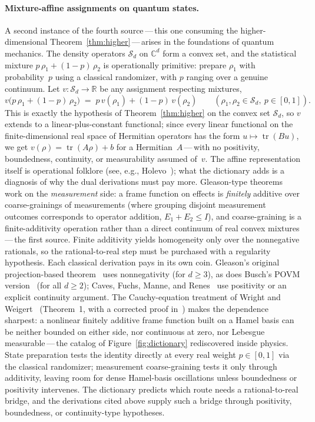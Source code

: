 \documentclass{article}
\theoremstyle{plain}
\theoremstyle{definition}
\newcommand{\R}{\mathbb{R}}
\begin{document}
\paragraph{Mixture-affine assignments on quantum states.}
A second instance of the fourth source\,---\,this one consuming the
higher-dimensional Theorem~\ref{thm:higher}\,---\,arises in the
foundations of quantum mechanics. The density operators
$\mathcal{S}_d$ on $\mathbb{C}^d$ form a convex set, and the
statistical mixture $p\,\rho_1+(1-p)\,\rho_2$ is operationally
primitive: prepare $\rho_1$ with probability~$p$ using a classical
randomizer, with $p$ ranging over a genuine continuum. Let
$v\colon\mathcal{S}_d\to\R$ be any assignment respecting mixtures,
\[
v\bigl(p\,\rho_1+(1-p)\,\rho_2\bigr)\;=\;p\,v(\rho_1)+(1-p)\,v(\rho_2)
\qquad(\rho_1,\rho_2\in\mathcal{S}_d,\ p\in[0,1]).
\]
This is exactly the hypothesis of Theorem~\ref{thm:higher} on the
convex set $\mathcal{S}_d$, so $v$ extends to a linear-plus-constant
functional; since every linear functional on the finite-dimensional
real space of Hermitian operators has the form
$u\mapsto\operatorname{tr}(Bu)$, we get
$v(\rho)=\operatorname{tr}(A\rho)+b$ for a Hermitian~$A$\,---\,with
no positivity, boundedness, continuity, or measurability assumed
of~$v$. The affine representation itself is operational folklore
(see, e.g., Holevo~\cite[Lemma~1.6.1]{Holevo1982}); what the
dictionary adds is a diagnosis of why the dual derivations must pay
more. Gleason-type theorems work on the \emph{measurement} side: a
frame function on effects is \emph{finitely} additive over
coarse-grainings of measurements (where grouping disjoint measurement
outcomes corresponds to operator addition, $E_1 + E_2 \le I$), and
coarse-graining is a finite-additivity operation rather than a direct continuum of real convex mixtures\,---\,the first source.
Finite additivity yields homogeneity only over the nonnegative rationals, so the rational-to-real step must be purchased with a regularity hypothesis. Each classical derivation pays in its own coin. Gleason's original projection-based theorem~\cite{Gleason1957} uses nonnegativity (for $d \ge 3$), as does Busch's POVM version~\cite{Busch2003} (for all $d \ge 2$); Caves, Fuchs, Manne, and Renes~\cite{CFMR2004} use positivity or an explicit continuity argument. The Cauchy-equation treatment of Wright and Weigert~\cite{WrightWeigert2019} (Theorem~1, with a corrected proof in~\cite{WrightWeigert2020}) makes the dependence sharpest: a nonlinear finitely additive frame function built on a Hamel basis can be neither bounded on either side, nor continuous at zero, nor Lebesgue measurable\,---\,the catalog of Figure~\ref{fig:dictionary} rediscovered inside physics. State
preparation tests the identity directly at every real weight
$p\in[0,1]$ via the classical randomizer; measurement coarse-graining
tests it only through additivity, leaving room for dense Hamel-basis
oscillations unless boundedness or positivity intervenes. The dictionary
predicts which route needs a rational-to-real bridge, and the derivations cited above supply such a bridge through positivity, boundedness, or continuity-type hypotheses.
\end{document}
